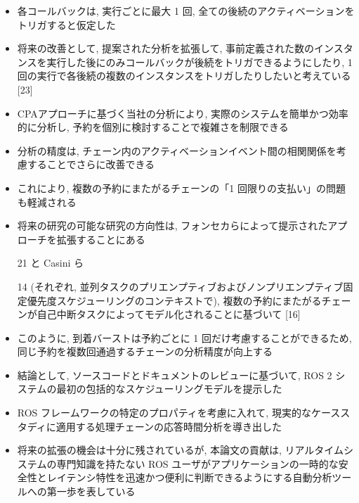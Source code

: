 \begin{frame}{}
    \begin{itemize}
        \item 各コールバックは, 実行ごとに最大 1 回, 全ての後続のアクティベーションをトリガすると仮定した
\item 将来の改善として, 提案された分析を拡張して, 事前定義された数のインスタンスを実行した後にのみコールバックが後続をトリガできるようにしたり, 1 回の実行で各後続の複数のインスタンスをトリガしたりしたいと考えている [23]
    \end{itemize}
\end{frame}

\begin{frame}{}
    \begin{itemize}
        \item CPAアプローチに基づく当社の分析により, 実際のシステムを簡単かつ効率的に分析し, 予約を個別に検討することで複雑さを制限できる
\item 分析の精度は, チェーン内のアクティベーションイベント間の相関関係を考慮することでさらに改善できる
\item これにより, 複数の予約にまたがるチェーンの「1 回限りの支払い」の問題も軽減される
\item 将来の研究の可能な研究の方向性は, フォンセカらによって提示されたアプローチを拡張することにある
\item [21] と Casini ら
\item [14] (それぞれ, 並列タスクのプリエンプティブおよびノンプリエンプティブ固定優先度スケジューリングのコンテキストで), 複数の予約にまたがるチェーンが自己中断タスクによってモデル化されることに基づいて [16]
\item このように, 到着バーストは予約ごとに 1 回だけ考慮することができるため, 同じ予約を複数回通過するチェーンの分析精度が向上する
    \end{itemize}
\end{frame}

\begin{frame}{}
    \begin{itemize}
        \item 結論として, ソースコードとドキュメントのレビューに基づいて, ROS 2 システムの最初の包括的なスケジューリングモデルを提示した
\item ROS フレームワークの特定のプロパティを考慮に入れて, 現実的なケーススタディに適用する処理チェーンの応答時間分析を導き出した
\item 将来の拡張の機会は十分に残されているが, 本論文の貢献は, リアルタイムシステムの専門知識を持たない ROS ユーザがアプリケーションの一時的な安全性とレイテンシ特性を迅速かつ便利に判断できるようにする自動分析ツールへの第一歩を表している
    \end{itemize}
\end{frame}

